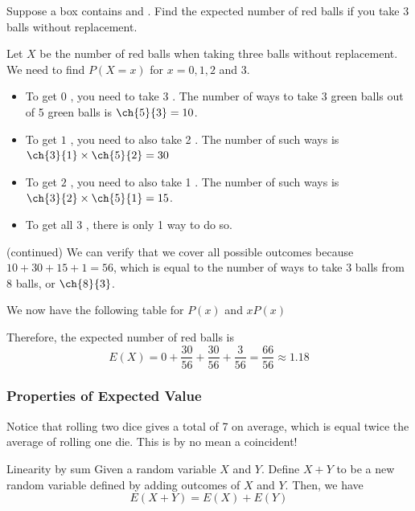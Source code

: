 \begin{frame}[t]
\begin{ex}
Suppose a box contains  and . Find the expected number of red balls if you take 3 balls without replacement.
\end{ex}
\begin{sol}
Let $X$ be the number of red balls when taking three balls without replacement. We need to find $P(X = x)$ for $x = 0,1,2$ and $3$. 
\begin{itemize}
\item To get $0$ , you need to take 3 . The number of ways to take 3 green balls out of 5 green balls is $\ch{5}{3} = 10$.
\item To get $1$ , you need to also take 2 . The number of such ways is $\ch{3}{1} \times \ch{5}{2} = 30$
\item To get $2$ , you need to also take 1 . The number of such ways is $\ch{3}{2} \times \ch{5}{1} = 15$.
\item To get all $3$ , there is only 1 way to do so.
\end{itemize}
\end{sol}
\end{frame}

\begin{frame}[t]
\begin{sol} (continued)
We can verify that we cover all possible outcomes because $10+30+15+1 = 56$, which is equal to the number of ways to take $3$ balls from $8$ balls, or $\ch{8}{3}$.

We now have the following table for $P(x)$ and $xP(x)$
\begin{table}[h!]
\end{table}
Therefore, the expected number of red balls is 
\[ E(X) = 0 + \frac{30}{56} + \frac{30}{56} + \frac{3}{56} = \frac{66}{56} \approx 1.18\]
\end{sol}
\end{frame}


\begin{frame}
\frametitle{Properties of Expected Value}
Notice that rolling two dice gives a total of 7 on average, which is equal twice the average of rolling one die. This is by no mean a coincident!
\begin{thm}{Linearity by sum}{}
Given a random variable $X$ and $Y$. Define $X + Y$ to be a new random variable defined by adding outcomes of $X$ and $Y$. Then, we have
\[E(X+Y) = E(X) + E(Y)\]
\end{thm}
\end{frame}


